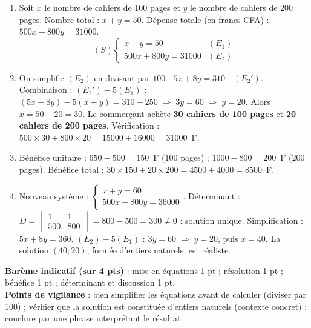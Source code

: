 \documentclass[11pt]{article}
\begin{document}
\begin{corrige}
\begin{enumerate}
\item Soit $x$ le nombre de cahiers de 100 pages et $y$ le nombre de cahiers de 200 pages.
Nombre total : $x + y = 50$.
Dépense totale (en francs CFA) : $500x + 800y = \num{31000}$.
\[ (S) \begin{cases} x + y = 50 & (E_1) \\ 500x + 800y = \num{31000} & (E_2) \end{cases} \]

\item On simplifie $(E_2)$ en divisant par $100$ : $5x + 8y = 310 \quad (E_2')$.
Combinaison : $(E_2') - 5(E_1)$ : $(5x+8y) - 5(x+y) = 310 - 250 \;\Rightarrow\; 3y = 60 \;\Rightarrow\; y = 20$.
Alors $x = 50 - 20 = 30$.
Le commerçant achète \textbf{30 cahiers de 100 pages} et \textbf{20 cahiers de 200 pages}.
Vérification : $500\times 30 + 800\times 20 = \num{15000} + \num{16000} = \num{31000}$~F.

\item Bénéfice unitaire : $650 - 500 = 150$~F (100 pages) ; $\num{1000} - 800 = 200$~F (200 pages).
Bénéfice total : $30\times 150 + 20\times 200 = \num{4500} + \num{4000} = \num{8500}$~F.

\item Nouveau système : $\begin{cases} x + y = 60 \\ 500x + 800y = \num{36000} \end{cases}$.
Déterminant : $D = \begin{vmatrix} 1 & 1 \\ 500 & 800 \end{vmatrix} = 800 - 500 = 300 \neq 0$ : solution unique.
Simplification : $5x + 8y = 360$. $(E_2) - 5(E_1)$ : $3y = 60 \;\Rightarrow\; y = 20$, puis $x = 40$.
La solution $(40 ; 20)$, formée d'entiers naturels, est réaliste.
\end{enumerate}
\textbf{Barème indicatif (sur 4 pts)} : mise en équations 1 pt ; résolution 1 pt ; bénéfice 1 pt ; déterminant et discussion 1 pt.\\
\textbf{Points de vigilance} : bien simplifier les équations avant de calculer (diviser par 100) ; vérifier que la solution est constituée d'entiers naturels (contexte concret) ; conclure par une phrase interprétant le résultat.
\end{corrige}
\end{document}
